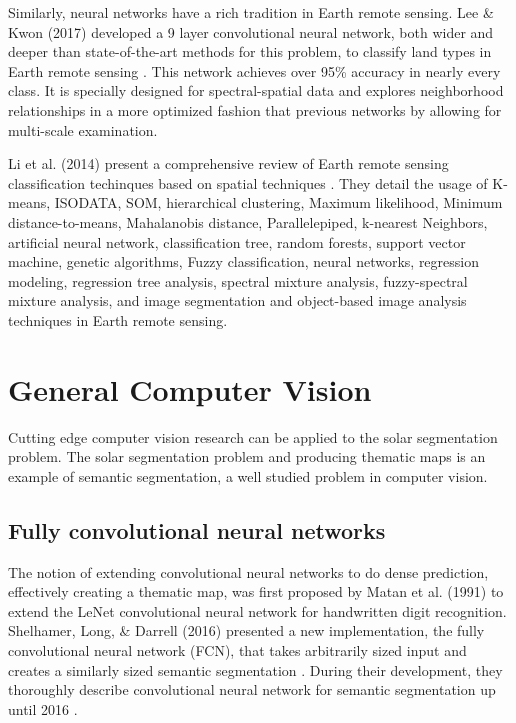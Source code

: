\documentclass[twoside]{report}
\begin{document}
Similarly, neural networks have a rich tradition in Earth remote sensing. Lee \& Kwon (2017) developed a 9 layer convolutional neural network, both wider and deeper than state-of-the-art methods for this problem, to classify land types in Earth remote sensing \cite{lee2017going}. This network achieves over 95\% accuracy in nearly every class. It is specially designed for spectral-spatial data and explores neighborhood relationships in a more optimized fashion that previous networks by allowing for multi-scale examination.

Li et al. (2014) present a comprehensive review of Earth remote sensing classification techinques based on spatial techniques \cite{li2014review}. They detail the usage of K-means, ISODATA, SOM,
hierarchical clustering, Maximum likelihood, Minimum distance-to-means, Mahalanobis distance, Parallelepiped, k-nearest Neighbors,  artificial neural network, classification tree, random forests, support vector
machine, genetic algorithms, Fuzzy classification, neural networks, regression modeling, regression tree analysis, spectral mixture analysis, fuzzy-spectral mixture analysis,  and image segmentation and object-based image
analysis techniques in Earth remote sensing. 

\section{General Computer Vision}
Cutting edge computer vision research can be applied to the solar segmentation problem. The solar segmentation problem and producing thematic maps is an example of semantic segmentation, a well studied problem in computer vision. 

\subsection{Fully convolutional neural networks}
The notion of extending convolutional neural networks to do dense prediction, effectively creating a thematic map, was first proposed by Matan et al. (1991) \cite{matan} to extend the LeNet convolutional neural network \cite{lenet} for handwritten digit recognition. Shelhamer, Long, \& Darrell (2016) presented a new implementation, the fully convolutional neural network (FCN), that takes arbitrarily sized input and creates a similarly sized semantic segmentation \cite{fcnn}. During their development, they thoroughly describe convolutional neural network for semantic segmentation up until 2016 \cite{fcnn}.
\end{document}

